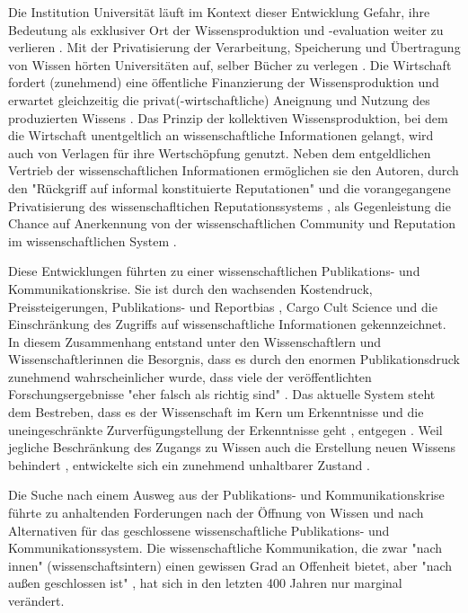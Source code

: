 Die Institution Universität läuft im Kontext dieser Entwicklung Gefahr, ihre Bedeutung als exklusiver Ort der Wissensproduktion und -evaluation weiter zu verlieren \cite{suchen}. Mit der Privatisierung der Verarbeitung, Speicherung und Übertragung von Wissen hörten Universitäten auf, selber Bücher zu verlegen \cite{cite:0}. Die Wirtschaft fordert (zunehmend) eine öffentliche Finanzierung der Wissensproduktion und erwartet gleichzeitig die privat(-wirtschaftliche) Aneignung und Nutzung des produzierten Wissens \cite{cite:2}. Das Prinzip der kollektiven Wissensproduktion, bei dem die Wirtschaft unentgeltlich an wissenschaftliche Informationen gelangt, wird auch von Verlagen für ihre Wertschöpfung genutzt. Neben dem entgeldlichen Vertrieb der wissenschaftlichen Informationen ermöglichen sie den Autoren, durch den "Rückgriff auf informal konstituierte Reputationen" \cite{luhmann_1970_selbststeuerung} und die vorangegangene Privatisierung des wissenschafltichen Reputationssystems \cite{suchen}, als Gegenleistung die Chance auf Anerkennung von der wissenschaftlichen Community und Reputation im wissenschaftlichen System \cite{cite:21a}.

Diese Entwicklungen führten zu einer wissenschaftlichen Publikations- und Kommunikationskrise. Sie ist durch den wachsenden Kostendruck, Preissteigerungen, Publikations- \cite{Egger_1997} \cite{Fanelli_2012} \cite{Beverungen_2012} \cite{Brembs_20013} und Reportbias \cite{Chan_2008} \cite{Dickersin_2011}, Cargo Cult Science \cite{Feynman_1974} und die Einschränkung des Zugriffs auf wissenschaftliche Informationen \cite{Hess_2006} gekennzeichnet. In diesem Zusammenhang entstand unter den Wissenschaftlern und Wissenschaftlerinnen die Besorgnis, dass es durch den enormen Publikationsdruck zunehmend wahrscheinlicher wurde, dass viele der veröffentlichten Forschungsergebnisse "eher falsch als richtig sind" \cite{Ioannidis_2005}. Das aktuelle System steht dem Bestreben, dass es der Wissenschaft im Kern um Erkenntnisse und die uneingeschränkte Zurverfügungstellung der Erkenntnisse geht \cite{hanekop_2006}, entgegen \cite{offhaus_2012_institutionelle_repos}. Weil jegliche Beschränkung des Zugangs zu Wissen auch die Erstellung neuen Wissens behindert \cite{cite:5} \cite{cite:8} \cite{Luhmann1998}, entwickelte sich ein zunehmend unhaltbarer Zustand \cite{Schekman_2013}.

Die Suche nach einem Ausweg aus der Publikations- und Kommunikationskrise führte zu anhaltenden Forderungen nach der Öffnung von Wissen und nach Alternativen für das geschlossene wissenschaftliche Publikations- und Kommunikationssystem. Die wissenschaftliche Kommunikation, die zwar "nach innen" (wissenschaftsintern) einen gewissen Grad an Offenheit bietet, aber "nach außen geschlossen ist" \cite{kelty_2004}, hat sich in den letzten 400 Jahren nur marginal verändert.

